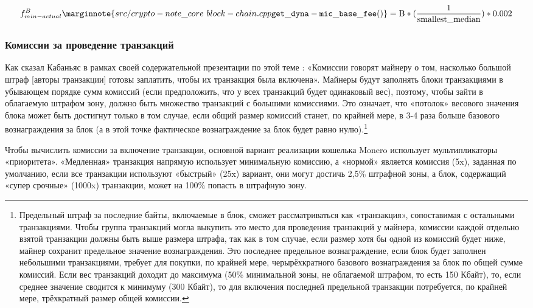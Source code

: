 \[f^{B}_{min-actual}\marginnote{src/crypto- note\_core\ block- chain.cpp {\tt get\_dyna- mic\_base\_ fee()}} = \textrm{B}*(\frac{1}{\textrm{smallest\_median}}) * 0.002\]

\subsubsection*{Комиссии за проведение транзакций}

Как сказал Кабаньяс в рамках своей содержательной презентации по этой теме \cite{articmine-36c3-dynamics}: «Комис\-сии говорят майнеру о том, насколько большой штраф [авторы транзакции] готовы заплатить, чтобы их транзакция была включена». Майнеры будут заполнять блоки транзакциями в убывающем порядке сумм комиссий \cite{articmine-36c3-dynamics} (если предположить, что у всех транзакций будет одинаковый вес), поэтому, чтобы зайти в облагаемую штрафом зону, должно быть множество транзакций с большими комиссиями. Это означает, что «потолок» весового значения блока может быть достигнут только в том случае, если общий размер комиссий станет, по крайней мере, в 3-4 раза больше базового вознаграждения за блок (а в этой точке фактическое вознаграждение за блок будет равно нулю).\footnote{\label{penaltyzonecost_footnote}Предельный штраф за последние байты, включаемые в блок, сможет рассматриваться как «транзакция», сопоставимая с остальными транзакциями. Чтобы группа транзакций могла выкупить это место для проведения транзакций у майнера, комиссии каждой отдельно взятой транзакции должны быть выше размера штрафа, так как в том случае, если размер хотя бы одной из комиссий будет ниже, майнер сохранит предельное значение вознаграждения. Это последнее предельное вознаграждение, если блок будет заполнен небольшими транзакциями, требует для покупки, по крайней мере, черырёхкратного базового вознаграждения за блок по общей сумме комиссий. Если вес транзакций доходит до максимума (50\% минимальной зоны, не облагаемой штрафом, то есть 150 Кбайт), то, если среднее значение сводится к минимуму (300 Кбайт), то для включения последней предельной транзакции потребуется, по крайней мере, трёхкратный размер общей комиссии.}

Чтобы вычислить комиссии за включение транзакции, основной вариант реализации кошель\-ка Monero использует мультипликаторы «приоритета». «Медленная» транзакция напрямую использует минимальную комиссию, а «нормой» является комиссия (5x), заданная по умолча\-нию, если все транзакции используют «быстрый» (25x) вариант, они могут достичь 2,5\% штрафной зоны, а блок, содержащий «супер срочные» (1000x) транзакции, может на 100\% попасть в штрафную зону.%

